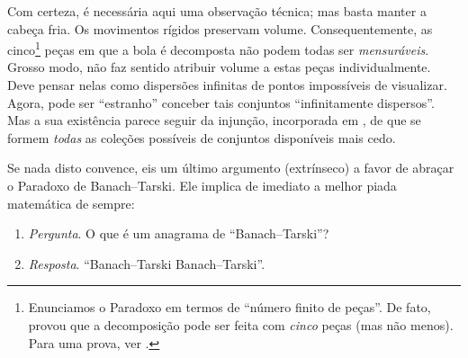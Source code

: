 \documentclass[../../../include/open-logic-section]{subfiles}
\begin{document}
Com certeza, é necessária aqui uma observação técnica; mas basta manter a cabeça fria. Os movimentos rígidos preservam volume.
Consequentemente, as cinco\footnote{Enunciamos o Paradoxo em termos de
``número finito de peças''. De fato, \citet{Robinson1947} provou que a
decomposição pode ser feita com \emph{cinco} peças
(mas não menos). Para uma prova, ver \citet[pp.~66--7]{Wagon2016}.} peças
em que a bola é decomposta não podem todas ser \emph{mensuráveis}.
Grosso modo, não faz sentido atribuir volume a estas
peças individualmente. Deve pensar nelas como dispersões infinitas de pontos
impossíveis de visualizar. Agora, pode ser ``estranho''
conceber tais conjuntos ``infinitamente dispersos''. Mas a sua existência
parece seguir da injunção, incorporada em \stagesacc{}, de que se formem
\emph{todas} as coleções possíveis de conjuntos disponíveis mais cedo.

Se nada disto convence, eis um último argumento (extrínseco) a favor de
abraçar o Paradoxo de Banach--Tarski. Ele implica de imediato
a melhor piada matemática de sempre:
\begin{enumerate}
	\item[] \emph{Pergunta}. O que é um anagrama de ``Banach--Tarski''? 
	\item[] \emph{Resposta}. ``Banach--Tarski Banach--Tarski''.
\end{enumerate}
\end{document}
